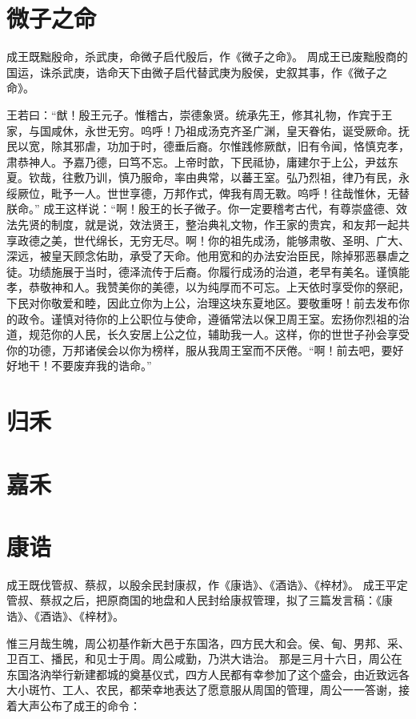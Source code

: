 \documentclass[12pt,UTF8]{ctexbook}
\begin{document}
\chapter{微子之命}

成王既黜殷命，杀武庚，命微子启代殷后，作《微子之命》。
周成王已废黜殷商的国运，诛杀武庚，诰命天下由微子启代替武庚为殷侯，史叙其事，作《微子之命》。

王若曰：“猷！殷王元子。惟稽古，崇德象贤。统承先王，修其礼物，作宾于王家，与国咸休，永世无穷。呜呼！乃祖成汤克齐圣广渊，皇天眷佑，诞受厥命。抚民以宽，除其邪虐，功加于时，德垂后裔。尔惟践修厥猷，旧有令闻，恪慎克孝，肃恭神人。予嘉乃德，曰笃不忘。上帝时歆，下民祗协，庸建尔于上公，尹兹东夏。钦哉，往敷乃训，慎乃服命，率由典常，以蕃王室。弘乃烈祖，律乃有民，永绥厥位，毗予一人。世世享德，万邦作式，俾我有周无斁。呜呼！往哉惟休，无替朕命。”
成王这样说：“啊！殷王的长子微子。你一定要稽考古代，有尊崇盛德、效法先贤的制度，就是说，效法贤王，整治典礼文物，作王家的贵宾，和友邦一起共享政德之美，世代绵长，无穷无尽。啊！你的祖先成汤，能够肃敬、圣明、广大、深远，被皇天顾念佑助，承受了天命。他用宽和的办法安治臣民，除掉邪恶暴虐之徒。功绩施展于当时，德泽流传于后裔。你履行成汤的治道，老早有美名。谨慎能孝，恭敬神和人。我赞美你的美德，以为纯厚而不可忘。上天依时享受你的祭祀，下民对你敬爱和睦，因此立你为上公，治理这块东夏地区。要敬重呀！前去发布你的政令。谨慎对待你的上公职位与使命，遵循常法以保卫周王室。宏扬你烈祖的治道，规范你的人民，长久安居上公之位，辅助我一人。这样，你的世世子孙会享受你的功德，万邦诸侯会以你为榜样，服从我周王室而不厌倦。“啊！前去吧，要好好地干！不要废弃我的诰命。”

\chapter{归禾}

\chapter{嘉禾}

\chapter{康诰}

成王既伐管叔、蔡叔，以殷余民封康叔，作《康诰》、《酒诰》、《梓材》。
成王平定管叔、蔡叔之后，把原商国的地盘和人民封给康叔管理，拟了三篇发言稿：《康诰》、《酒诰》、《梓材》。

惟三月哉生魄，周公初基作新大邑于东国洛，四方民大和会。侯、甸、男邦、采、卫百工、播民，和见士于周。周公咸勤，乃洪大诰治。
那是三月十六日，周公在东国洛汭举行新建都城的奠基仪式，四方人民都有幸参加了这个盛会，由近致远各大小斑竹、工人、农民，都荣幸地表达了愿意服从周国的管理，周公一一答谢，接着大声公布了成王的命令：
\end{document}
